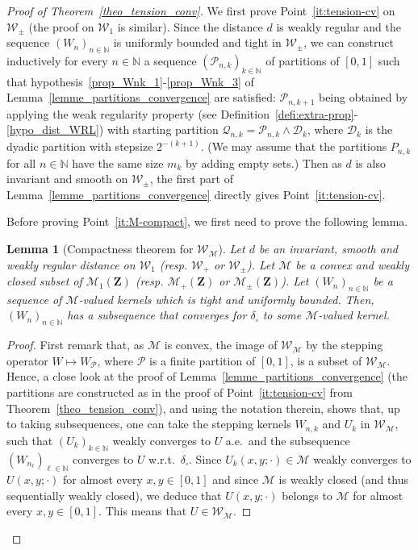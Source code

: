 \documentclass{amsart}
\newcommand{\wrt}{w.r.t.\ }
\newcommand{\aE}{a.e.\ }
\theoremstyle{plain}
\newtheorem{lemme}[Th]{Lemma}
\theoremstyle{definition}
\newcommand{\Space}{\mathbf{Z}}
\newcommand{\signed}{\pm}
\newcommand{\cm}{\mathcal{M}}
\newcommand{\cp}{\mathcal{P}}
\newcommand{\cD}{\mathcal{D}}
\newcommand{\cM}{\mathcal{M}}
\newcommand{\cP}{\mathcal{P}}
\newcommand{\cQ}{\mathcal{Q}}
\newcommand{\cW}{\mathcal{W}}
\newcommand{\Proba}{\mathcal{M}_1(\Space)}
\newcommand{\Meas}{\mathcal{M}_+(\Space)}
\newcommand{\SignedMeas}{\mathcal{M}_{\pm}(\Space)}
\newcommand{\Graphon}{\mathcal{W}_1}
\newcommand{\Kernel}{\mathcal{W}_{\signed}}
\newcommand{\Kernelp}{\mathcal{W}_{+}}
\newcommand{\KernelM}{\mathcal{W}_\cm}
\newcommand{\dd}{\delta_{\square}}
\newcommand{\N}{\mathbb{N}}
\begin{document}
\begin{proof}[Proof of Theorem~\ref{theo_tension_conv}]
  We first  prove Point~\ref{it:tension-cv} on $\Kernel$  (the proof on
  $\Graphon$ is similar).  Since the  distance $d$ is weakly regular and
  the sequence  $( W_n  )_{n\in\N}$ is uniformly  bounded and  tight in
  $\Kernel$,  we  can  construct  inductively for  every  $n\in  \N$  a
  sequence $(\mathcal{P}_{n,k} )_{k\in\N}$   of partitions of $[0,1]$ such
  that          hypothesis~\ref{prop_Wnk_1}-\ref{prop_Wnk_3}         of
  Lemma~\ref{lemme_partitions_convergence} are satisfied:
  $\cP_{n,k+1}$ being obtained by applying the weak regularity property 
  	(see Definition~\ref{defi:extra-prop}-\ref{hypo_dist_WRL})
  	with starting partition $\cQ_{n,k} = \cP_{n,k} \land \cD_{k}$,
	where $\cD_k$ is the dyadic partition with stepsize $2^{-(k+1)}$.
  (We may assume that the partitions $P_{n,k}$ for all $n\in\N$
  	have the same size $m_k$ by adding empty sets.)
   Then as $d$ is
  also  invariant   and  smooth  on   $\Kernel$,  the  first   part  of
  Lemma~\ref{lemme_partitions_convergence} directly gives
  Point~\ref{it:tension-cv}.
  \medskip



Before proving Point~\ref{it:M-compact}, we first need to prove the following lemma.

\begin{lemme}[Compactness theorem for $\KernelM$]
	\label{lemma_M_convex_closed}
Let  $d$ be  an invariant,  smooth  and weakly  regular distance  on
    $\Graphon$ (resp. $\Kernelp$ or $\Kernel$).
Let $\cM$ be a convex and weakly closed subset of $\Proba$ (resp. $\Meas$ or $\SignedMeas$).
Let $(W_n)_{n\in\N}$ be a sequence of $\cM$-valued kernels
	which is tight and uniformly bounded.
Then, $(W_n)_{n\in\N}$ has a subsequence that converges for $\dd$
	to some $\cM$-valued kernel.
\end{lemme}

\begin{proof}
First remark that, as $\cM$ is convex, the image  of ${\cW} _\cm$ by  the stepping
  operator  $W \mapsto  W_\cp$, where  $\cp$  is a  finite partition  of
  $[0, 1]$,  is a subset of  ${\cW} _\cm$.
  Hence, a close look at the
  proof  of  Lemma~\ref{lemme_partitions_convergence}
  (the partitions are constructed as in the proof of Point~\ref{it:tension-cv} 
  		from Theorem~\ref{theo_tension_conv}),   
  and  using  the
  notation therein, shows that, up  to taking subsequences, one can take
  the  stepping kernels  $W_{n,k}$  and $U_k$  in  $\cW_\cm$, such  that
  $(U_k )_{k\in\N}$ weakly converges  to $U$ \aE and  the subsequence
  $(W_{n_\ell})_{\ell\in\N}$  converges  to  $U$   \wrt  $\dd$.   Since
  $U_k(x,y;\cdot) \in \cm$ weakly converges to $U(x,y;\cdot)$ for almost
  every  $x,y\in  [0,1]$ and  since  $\cm$  is weakly closed (and thus sequentially weakly closed), 
  we  deduce  that $U(x,y;\cdot)$ belongs to $\cm$ for almost every $x,y\in [0,1]$.  This
  means   that  $U\in   \cW_\cm$. 
\end{proof}


\end{proof}
\end{document}
